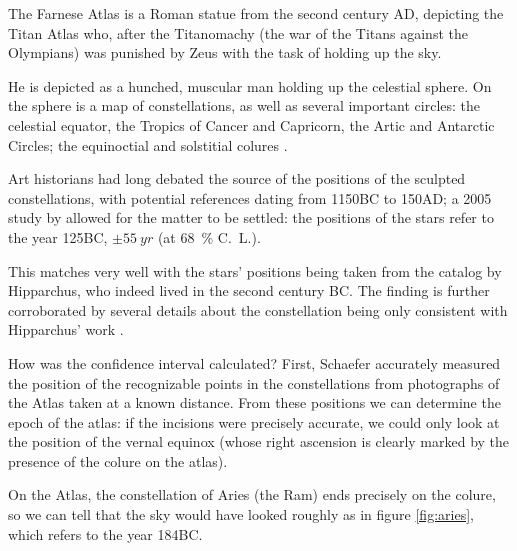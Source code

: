 \documentclass[main.tex]{subfiles}
\begin{document}
The Farnese Atlas is a Roman statue from the second century AD, depicting the Titan Atlas who, after the Titanomachy (the war of the Titans against the Olympians) was punished by Zeus with the task of holding up the sky.

He is depicted as a hunched, muscular man holding up the celestial sphere. On the sphere is a map of constellations, as well as several important circles: the celestial equator, the Tropics of Cancer and Capricorn, the Artic and Antarctic Circles; the equinoctial and solstitial colures \cite[table 4]{schaeferEpochConstellationsFarnese2005}. 

Art historians had long debated the source of the positions of the sculpted constellations, with potential references dating from 1150BC to 150AD; a 2005 study by \textcite[]{schaeferEpochConstellationsFarnese2005} allowed for the matter to be settled: the positions of the stars refer to the year 125BC, \(\pm \SI{55}{yr}\) (at \SI{68}{\percent} C.\ L.).

This matches very well with the stars' positions being taken from the catalog by Hipparchus, who indeed lived in the second century BC. 
The finding is further corroborated by several details about the constellation being only consistent with Hipparchus' work \cite[sec.\ 2]{schaeferEpochConstellationsFarnese2005}.

How was the confidence interval calculated? First, Schaefer accurately measured the position of the recognizable points in the constellations from photographs of the Atlas taken at a known distance.
From these positions we can determine the epoch of the atlas: if the incisions were precisely accurate, we could only look at the position of the vernal equinox (whose right ascension is clearly marked by the presence of the colure on the atlas).

On the Atlas, the constellation of Aries (the Ram) ends precisely on the colure, so we can tell that the sky would have looked roughly as in figure \ref{fig:aries}, which refers to the year 184BC. 

\end{document}
